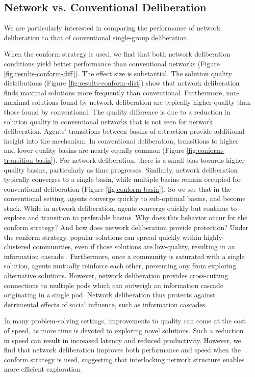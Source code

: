 \subsection{Network vs. Conventional Deliberation}
We are particularly interested in comparing the performance of network deliberation to that of conventional single-group deliberation.

When the conform strategy is used, we find that both network deliberation conditions yield better performance than conventional networks (Figure \ref{fig:results-conform-diff}).  The effect size is substantial. The solution quality distributions (Figure \ref{fig:results-conform-dist}) show that network deliberation finds maximal solutions more frequently than conventional. Furthermore, non-maximal solutions found by network deliberation are typically higher-quality than those found by conventional.
The quality difference is due to a reduction in solution quality in conventional networks that is not seen for network deliberation.
Agents' transitions between basins of attraction provide additional insight into the mechanism.
In conventional deliberation, transitions to higher and lower quality basins are nearly equally common (Figure \ref{fig:conform-transition-basin}).
For network deliberation, there is a small bias towards higher quality basins, particularly as time progresses.
Similarly, network deliberation typically converges to a single basin, while multiple basins remain occupied for conventional deliberation (Figure \ref{fig:conform-basin}).
So we see that in the conventional setting, agents converge quickly to sub-optimal basins, and become stuck.
While in network deliberation, agents converge quickly but continue to explore and transition to preferable basins.
Why does this behavior occur for the conform strategy? And how does network deliberation provide protection?
Under the conform strategy, popular solutions can spread quickly within highly-clustered communities, even if those solutions are low-quality,
resulting in an information cascade \cite{banerjee_simple_1992}.
Furthermore, once a community is saturated with a single solution, agents mutually reinforce each other, preventing any from exploring alternative solutions.
However, network deliberation provides cross-cutting connections to multiple pods which can outweigh an information cascade originating in a single pod.
Network deliberation thus protects against detrimental effects of social influence, such as information cascades.

In many problem-solving settings, improvements to quality can come at the cost of speed, as more time is devoted to exploring novel solutions.
Such a reduction in speed can result in increased latency and reduced productivity.
However, we find that network deliberation improves both performance and speed when the conform strategy is used, suggesting that interlocking network structure enables more efficient exploration.

